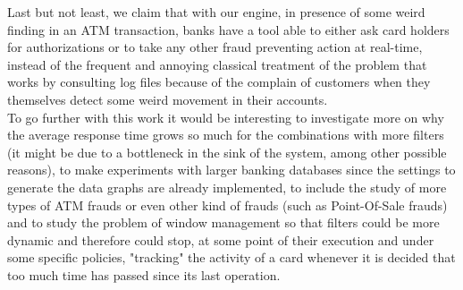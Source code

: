 Last but not least, we claim that with our engine, in presence of some weird  finding in an ATM transaction, 
banks have a tool able to either ask card holders for authorizations or to take any other fraud preventing action at real-time, 
instead of the frequent and annoying classical treatment of the problem that works  by consulting log files because of the complain 
of customers when they themselves detect some weird movement in their accounts.\\

To go further with this work it would be interesting to investigate more on why the average response time grows so much for the combinations 
with more filters (it might be due to a bottleneck in the sink of the system, among other possible reasons), to make experiments with larger banking databases since the settings 
to generate the data graphs are already implemented, to include the study of more types of ATM frauds or even other kind of frauds (such as Point-Of-Sale frauds) 
and to study the problem of window management so 
that filters could be more dynamic and therefore could stop, at some point of their execution and under some specific policies, 
"tracking" the activity of a card whenever it is decided that too much time has passed since its last operation. 